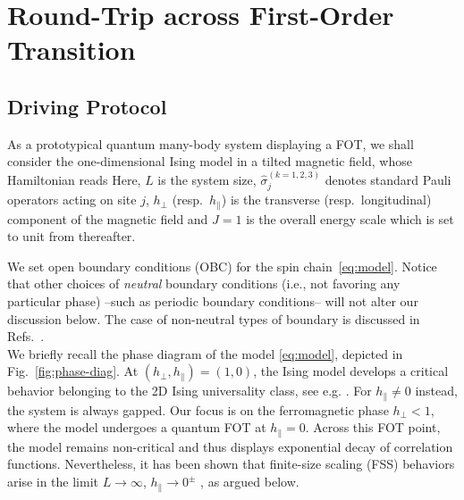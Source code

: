 \newpage
\newpage 

\section{Round-Trip across First-Order Transition}
\label{rtripfoqt}

\subsection{Driving Protocol}

As a prototypical quantum many-body system displaying a FOT, we shall consider the one-dimensional Ising model in a tilted magnetic field, whose Hamiltonian reads
Here, $L$ is the system size, $\hat\sigma _j^{(k=1,2,3)}$ denotes standard Pauli operators acting on site $j$, $h_\perp$ (resp.~$h_\parallel$) is the transverse (resp.~longitudinal) component of the magnetic field and $J=1$ is the overall energy scale which is set to unit from thereafter.

 We set open boundary conditions (OBC) for the spin chain~\eqref{eq:model}. Notice that other choices of {\it neutral} boundary conditions (i.e., not favoring any particular phase) --such as periodic boundary conditions-- will not alter our discussion below. The case of non-neutral types of boundary is discussed in Refs.~\cite{fontana2019scaling,pelissetto2020scaling,panagopoulos2018dynamic,campostrini2015quantum,pelissetto2018finite,rossini2018ground}. \\

We briefly recall the phase diagram of the model \eqref{eq:model}, depicted in Fig.~\ref{fig:phase-diag}. At $(h_\perp,h_\parallel)=(1,0)$, the Ising model develops a critical behavior belonging to the 2D Ising universality class, see e.g. \cite{S99}. For $h_\parallel\neq 0$ instead, the system is always gapped. Our focus is on the ferromagnetic phase $h_\perp<1$, where the model undergoes a quantum FOT at $h_\parallel=0$. Across this FOT point, the model remains non-critical and thus displays exponential decay of correlation functions. Nevertheless, it has been shown that finite-size scaling (FSS) behaviors arise in the limit $L\to\infty$, $h_\parallel\to0^\pm$ \cite{P90}, as argued below.\\

